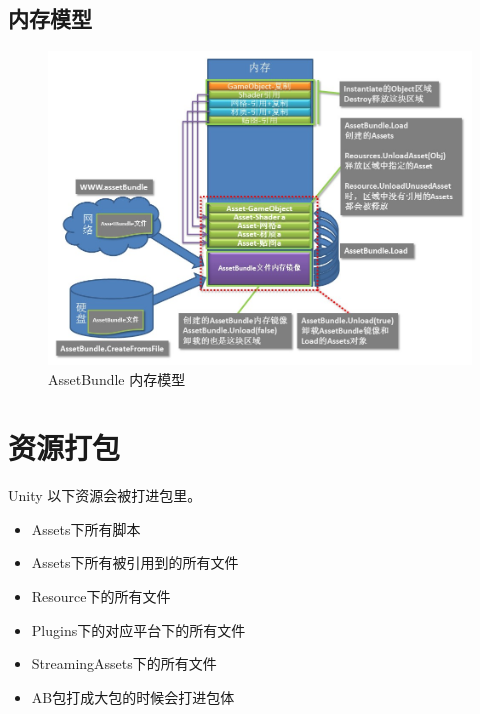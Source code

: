 \documentclass[UTF8,a4paper,12pt]{ctexbook}
\begin{document}
		\subsection{内存模型}
			\begin{figure}[H]
				\centering
				\includegraphics[scale=0.7]{assetBundel}
				\caption{AssetBundle 内存模型}
		\end{figure}
		
	\section{资源打包}
		Unity  以下资源会被打进包里。
		\begin{itemize}
			\item Assets下所有脚本
			\item Assets下所有被引用到的所有文件
			\item Resource下的所有文件
			\item Plugins下的对应平台下的所有文件
			\item StreamingAssets下的所有文件
			\item AB包打成大包的时候会打进包体
		\end{itemize}
		
\end{document}
